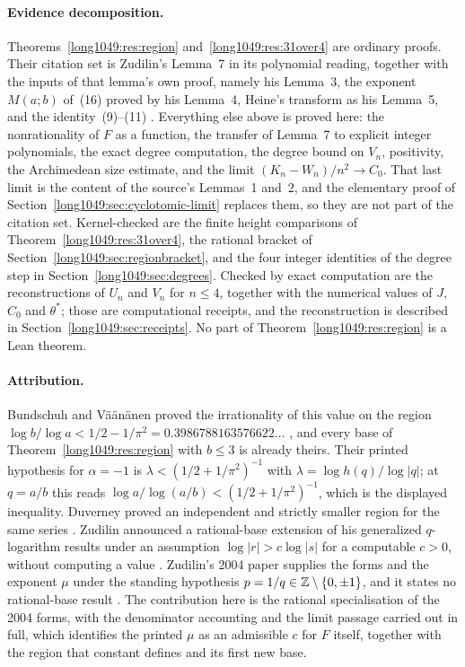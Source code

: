 \documentclass[11pt]{article}
\begin{document}
\paragraph{Evidence decomposition.}
Theorems~\ref{long1049:res:region} and~\ref{long1049:res:31over4} are ordinary proofs.  Their
citation set is Zudilin's Lemma~7 in its polynomial reading, together with the
inputs of that lemma's own proof, namely his Lemma~3, the exponent $M(a;b)$
of~(16) proved by his Lemma~4, Heine's transform as his Lemma~5, and the
identity~(9)--(11) \cite{zudilin2004}.  Everything else above is proved here:
the nonrationality of $F$ as a function, the transfer of Lemma~7 to explicit
integer polynomials, the exact degree computation, the degree bound on $V_n$,
positivity, the Archimedean size estimate, and the limit
$(K_n-W_n)/n^{2}\to C_0$.  That last limit is the content of the source's
Lemmas~1 and~2, and the elementary proof of
Section~\ref{long1049:sec:cyclotomic-limit} replaces them, so they are not part of the
citation set.  Kernel-checked are the finite height comparisons of
Theorem~\ref{long1049:res:31over4}, the rational bracket of
Section~\ref{long1049:sec:regionbracket}, and the four integer identities of the degree
step in Section~\ref{long1049:sec:degrees}.  Checked by exact computation are the
reconstructions of $U_n$ and $V_n$ for $n\le4$, together with the numerical
values of $J$, $C_0$ and $\theta^{*}$; those are computational receipts, and
the reconstruction is described in Section~\ref{long1049:sec:receipts}.  No part of
Theorem~\ref{long1049:res:region} is a Lean theorem.

\paragraph{Attribution.}
Bundschuh and V\"a\"an\"anen proved the irrationality of this value on the
region $\log b/\log a<1/2-1/\pi^{2}=0.3986788163576622\ldots$
\cite[Thm.~2, p.~177; hypotheses pp.~175--176]{bv1994}, and every base of
Theorem~\ref{long1049:res:region} with $b\le3$ is already theirs.  Their printed
hypothesis for $\alpha=-1$ is $\lambda<(1/2+1/\pi^{2})^{-1}$ with
$\lambda=\log h(q)/\log|q|$; at $q=a/b$ this reads
$\log a/\log(a/b)<(1/2+1/\pi^{2})^{-1}$, which is the displayed inequality.  Duverney proved an
independent and strictly smaller region for the same series
\cite[Th\'eor\`eme~2, p.~174]{duverney1996}.  Zudilin announced a rational-base
extension of his generalized $q$-logarithm results under an assumption
$\log|r|>c\log|s|$ for a computable $c>0$, without computing a value
\cite{zudilin2016}.  Zudilin's 2004 paper supplies the forms and the exponent
$\mu$ under the standing hypothesis $p=1/q\in\mathbb{Z}\mathbin{\backslash}\{0,\pm1\}$, and it
states no rational-base result \cite[Sec.~2, p.~154; Thm.~1]{zudilin2004}.  The
contribution here is the rational specialisation of the 2004 forms, with the
denominator accounting and the limit passage carried out in full, which
identifies the printed $\mu$ as an admissible $c$ for $F$ itself, together with
the region that constant defines and its first new base.
\end{document}
